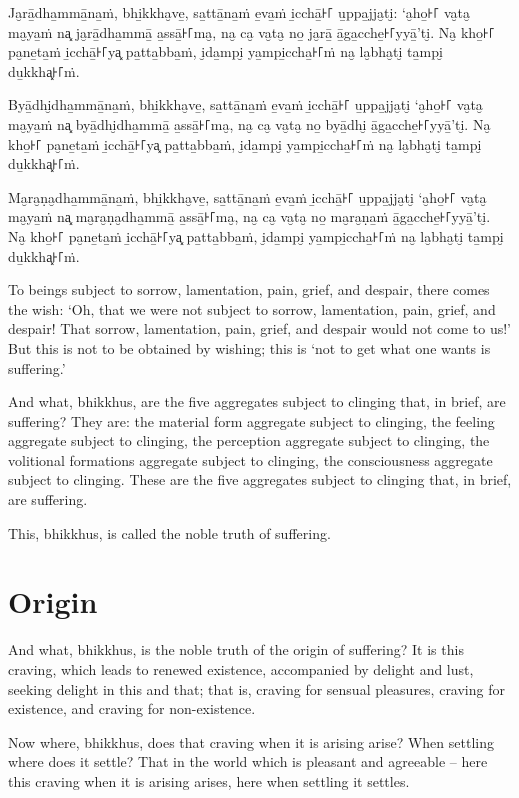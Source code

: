 Ja̮rā̱dha̱mmā̱na̱ṁ, bhi̱kkha̮ve̱, sa̱ttā̱na̱ṁ e̱va̱ṁ i̱cchā̱꜔꜒ u̱ppa̱jja̮ti̮: ‘a̮ho̱꜔꜒ va̮ta̮ ma̮ya̱ṁ na͓
ja̮rā̱dha̱mmā̱ a̱ssā̱꜔꜒ma̮, na̮ ca̮ va̮ta̮ no̱ ja̮rā̱ ā̱ga̱cche̱꜔꜒yyā̱’ti̮. Na̮ kho̱꜔꜒ pa̮ne̱ta̱ṁ i̱cchā̱꜔꜒ya͓
pa̱tta̱bba̱ṁ, i̮da̱mpi̮ ya̱mpi̱ccha̱꜔꜒ṁ na̮ la̮bha̮ti̮ ta̱mpi̮ du̱kkha͓꜔꜒ṁ.

Byā̱dhi̮dha̱mmā̱na̱ṁ, bhi̱kkha̮ve̱, sa̱ttā̱na̱ṁ e̱va̱ṁ i̱cchā̱꜔꜒ u̱ppa̱jja̮ti̮ ‘a̮ho̱꜔꜒ va̮ta̮ ma̮ya̱ṁ na͓
byā̱dhi̮dha̱mmā̱ a̱ssā̱꜔꜒ma̮, na̮ ca̮ va̮ta̮ no̱ byā̱dhi̮ ā̱ga̱cche̱꜔꜒yyā̱’ti̮. Na̮ kho̱꜔꜒ pa̮ne̱ta̱ṁ i̱cchā̱꜔꜒ya͓
pa̱tta̱bba̱ṁ, i̮da̱mpi̮ ya̱mpi̱ccha̱꜔꜒ṁ na̮ la̮bha̮ti̮ ta̱mpi̮ du̱kkha͓꜔꜒ṁ.

Ma̮ra̮ṇa̮dha̱mmā̱na̱ṁ, bhi̱kkha̮ve̱, sa̱ttā̱na̱ṁ e̱va̱ṁ i̱cchā̱꜔꜒ u̱ppa̱jja̮ti̮ ‘a̮ho̱꜔꜒ va̮ta̮ ma̮ya̱ṁ na͓
ma̮ra̮ṇa̮dha̱mmā̱ a̱ssā̱꜔꜒ma̮, na̮ ca̮ va̮ta̮ no̱ ma̮ra̮ṇa̱ṁ ā̱ga̱cche̱꜔꜒yyā̱’ti̮. Na̮ kho̱꜔꜒ pa̮ne̱ta̱ṁ i̱cchā̱꜔꜒ya͓
pa̱tta̱bba̱ṁ, i̮da̱mpi̮ ya̱mpi̱ccha̱꜔꜒ṁ na̮ la̮bha̮ti̮ ta̱mpi̮ du̱kkha͓꜔꜒ṁ.

\englishPage

To beings subject to sorrow, lamentation, pain, grief, and despair, there comes
the wish: `Oh, that we were not subject to sorrow, lamentation, pain, grief, and
despair! That sorrow, lamentation, pain, grief, and despair would not come to
us!' But this is not to be obtained by wishing; this is `not to get what one
wants is suffering.'

And what, bhikkhus, are the five aggregates subject to clinging that, in brief,
are suffering? They are: the material form aggregate subject to clinging, the
feeling aggregate subject to clinging, the perception aggregate subject to
clinging, the volitional formations aggregate subject to clinging, the
consciousness aggregate subject to clinging. These are the five aggregates
subject to clinging that, in brief, are suffering.

This, bhikkhus, is called the noble truth of suffering.

\section{Origin}

And what, bhikkhus, is the noble truth of the origin of suffering? It is this
craving, which leads to renewed existence, accompanied by delight and lust,
seeking delight in this and that; that is, craving for sensual pleasures,
craving for existence, and craving for non-existence.

Now where, bhikkhus, does that craving when it is arising arise? When settling
where does it settle? That in the world which is pleasant and agreeable -- here
this craving when it is arising arises, here when settling it settles.


